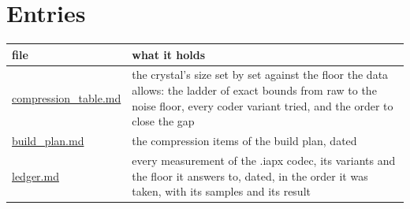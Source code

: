 \section{\texorpdfstring{Entries}{Entries}}

{\small
\setlength{\tabcolsep}{6pt}
\begin{longtable}{>{\RaggedRight\arraybackslash}p{}>{\RaggedRight\arraybackslash}p{}}
\toprule
file & what it holds \\
\midrule
\endhead
\hyperref[chap:compression-table]{compression\_\allowbreak{}table.md} & the crystal's size set by set against the floor the data allows: the ladder of exact bounds from raw to the noise floor, every coder variant tried, and the order to close the gap \\
\hyperref[chap:build-plan]{build\_\allowbreak{}plan.md} & the compression items of the build plan, dated \\
\hyperref[chap:ledger]{ledger.md} & every measurement of the .iapx codec, its variants and the floor it answers to, dated, in the order it was taken, with its samples and its result \\
\bottomrule
\end{longtable}
}
